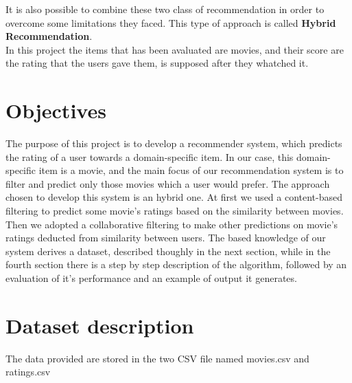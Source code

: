 \documentclass{article}
\begin{document}
It is also possible to combine these two class of recommendation in order to overcome some limitations they faced. This type of approach is called \textbf{Hybrid Recommendation}.\\
In this project the items that has been avaluated are movies, and their score are the rating that the users gave them, is supposed after they whatched it.

\newpage

\section{Objectives}

The purpose of this project is to develop a recommender system, which predicts the rating of a user towards a domain-specific item. In our case, this domain-specific item is a movie, and the main focus of our recommendation system is to filter and predict only those movies which a user would prefer. The approach chosen to develop this system is an hybrid one. At first we used a content-based filtering to predict some movie’s ratings based on the similarity between movies. Then we adopted a collaborative filtering to make other predictions on movie’s ratings deducted from similarity between users. The based knowledge of our system derives a dataset, described thoughly in the next section, while in the fourth section there is a step by step description of the algorithm, followed by an evaluation of it’s performance and an example of output it generates.

\section{Dataset description}
The data provided are stored in the two CSV file named movies.csv and ratings.csv
\end{document}
